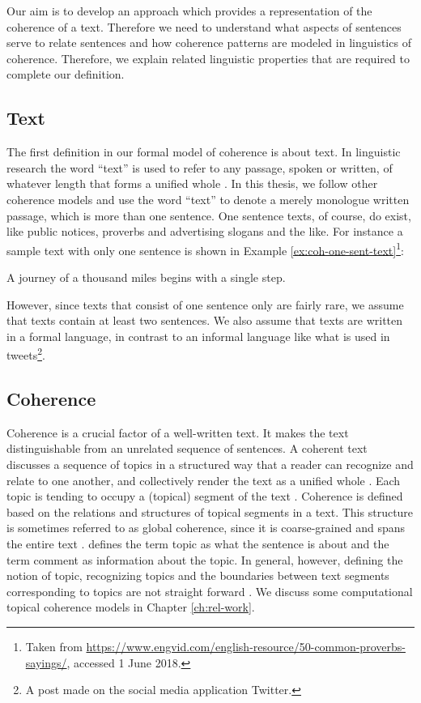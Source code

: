 Our aim is to develop an approach which provides a representation of the coherence of a text. 
Therefore we need to understand what aspects of sentences serve to relate sentences and how coherence patterns are modeled in linguistics of coherence. 
Therefore, we explain related linguistic properties that are required to complete our definition. 


\subsection{Text}

The first definition in our formal model of coherence is about text. 
In linguistic research the word ``text'' is used to refer to any passage, spoken or written, of whatever length that forms a unified whole \cite{halliday76}. 
In this thesis, we follow other coherence models \cite{barzilay08,guinaudeau13} and use the word ``text'' to denote a merely monologue written passage, which is more than one sentence.
One sentence texts, of course, do exist, like public notices, proverbs and advertising slogans and the like. 
For instance a sample text with only one sentence is shown in Example \ref{ex:coh-one-sent-text}\footnote{Taken from \url{https://www.engvid.com/english-resource/50-common-proverbs-sayings/}, accessed 1 June 2018.}: 

\begin{examples}
    \label{ex:coh-one-sent-text}
    A journey of a thousand miles begins with a single step.
\end{examples}

However, since texts that consist of one sentence only are fairly rare, we assume that texts contain at least two sentences. 
We also assume that texts are written in a formal language, in contrast to an informal language like what is used in tweets\footnote{A post made on the social media application Twitter.}. 

\subsection{Coherence}

Coherence is a crucial factor of a well-written text. 
It makes the text distinguishable from an unrelated sequence of sentences. 
A coherent text discusses a sequence of topics in a structured way that a reader can recognize and relate to one another, and collectively render the text as a unified whole \cite{stede12}. 
Each topic is tending to occupy a (topical) segment of the text \cite{hearst97}. 
Coherence is defined based on the relations and structures of topical segments in a text. 
This structure is sometimes referred to as global coherence, since it is coarse-grained and spans the entire text \cite{elsner07}. 
 defines the term topic as what the sentence is about and the term comment as information about the topic.  
In general, however, defining the notion of topic, recognizing topics and the boundaries between text segments corresponding to topics are not straight forward \cite{stede12}. 
We discuss some computational topical coherence models in Chapter \ref{ch:rel-work}. 


